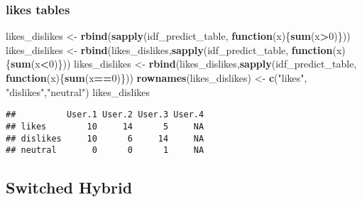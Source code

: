 \documentclass[]{article}
\newenvironment{Shaded}{\begin{snugshade}}{\end{snugshade}}
\newcommand{\ControlFlowTok}[1]{\textcolor[rgb]{0.13,0.29,0.53}{\textbf{#1}}}
\newcommand{\DecValTok}[1]{\textcolor[rgb]{0.00,0.00,0.81}{#1}}
\newcommand{\KeywordTok}[1]{\textcolor[rgb]{0.13,0.29,0.53}{\textbf{#1}}}
\newcommand{\NormalTok}[1]{#1}
\newcommand{\OperatorTok}[1]{\textcolor[rgb]{0.81,0.36,0.00}{\textbf{#1}}}
\newcommand{\StringTok}[1]{\textcolor[rgb]{0.31,0.60,0.02}{#1}}
\begin{document}
\hypertarget{likes-tables-2}{%
\subsubsection{likes tables}\label{likes-tables-2}}

\begin{Shaded}
\begin{Highlighting}[]
\NormalTok{likes_dislikes <-}\StringTok{ }\KeywordTok{rbind}\NormalTok{(}\KeywordTok{sapply}\NormalTok{(idf_predict_table, }\ControlFlowTok{function}\NormalTok{(x)\{}\KeywordTok{sum}\NormalTok{(x}\OperatorTok{>}\DecValTok{0}\NormalTok{)\}))}
\NormalTok{likes_dislikes <-}\StringTok{ }\KeywordTok{rbind}\NormalTok{(likes_dislikes,}\KeywordTok{sapply}\NormalTok{(idf_predict_table, }\ControlFlowTok{function}\NormalTok{(x)\{}\KeywordTok{sum}\NormalTok{(x}\OperatorTok{<}\DecValTok{0}\NormalTok{)\}))}
\NormalTok{likes_dislikes <-}\StringTok{ }\KeywordTok{rbind}\NormalTok{(likes_dislikes,}\KeywordTok{sapply}\NormalTok{(idf_predict_table, }\ControlFlowTok{function}\NormalTok{(x)\{}\KeywordTok{sum}\NormalTok{(x}\OperatorTok{==}\DecValTok{0}\NormalTok{)\}))}
\KeywordTok{rownames}\NormalTok{(likes_dislikes) <-}\StringTok{ }\KeywordTok{c}\NormalTok{(}\StringTok{"likes"}\NormalTok{, }\StringTok{"dislikes"}\NormalTok{,}\StringTok{"neutral"}\NormalTok{)}
\NormalTok{likes_dislikes}
\end{Highlighting}
\end{Shaded}

\begin{verbatim}
##          User.1 User.2 User.3 User.4
## likes        10     14      5     NA
## dislikes     10      6     14     NA
## neutral       0      0      1     NA
\end{verbatim}

\hypertarget{switched-hybrid}{%
\subsection{Switched Hybrid}\label{switched-hybrid}}
\end{document}
